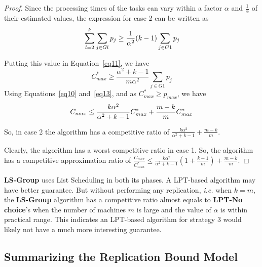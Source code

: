 \documentclass[twocolumn]{svjour3}
\begin{document}
\begin{proof}
  Since the processing times of the tasks can vary within a factor
  $\alpha$ and $\frac{1}{\alpha}$ of their estimated values, the
  expression for case 2 can be written as
  \begin{equation}{\nonumber}
    \sum_{l=2}^{k}\sum_{j \in Gl }^{}{ p_{j}} \geq \frac{1}{\alpha^2} (k-1)\sum_{j \in G1 }^{}{ p_{j}}
  \end{equation}
  
  Putting this value in Equation~\ref{eq11}, we have
  \begin{equation}\label{eq13}
    C_{max}^{*} \geq \frac{\alpha^2+k-1}{m\alpha^2}\sum_{j \in G1 }^{}{ p_{j}}
  \end{equation}
  Using Equations~\ref{eq10} and~\ref{eq13}, and as $C_{max}^{*} \geq p_{max}$, we have
  \begin{equation}{\nonumber}
    C_{max} \leq \frac{k\alpha^2}{\alpha^2+k-1}C_{max}^{*}+\frac{m-k}{m}C_{max}^{*}
  \end{equation}
  
  So, in case 2 the algorithm has a competitive ratio of
  $\frac{k\alpha^2}{\alpha^2+k-1}+\frac{m-k}{m}$.

  Clearly, the algorithm has a worst competitive ratio in case 1.  So,
  the algorithm has a competitive approximation ratio of
  $\frac{C_{max}}{C_{max}^{*}} \leq \frac{k\alpha^{2}}{\alpha^{2}+k-1}
  \left( 1+ {\frac{k-1}{m}} \right) + {\frac{m-k}{m}}$.
\end{proof}


\textbf{LS-Group} uses List Scheduling in both its phases. A LPT-based
algorithm may have better guarantee. But without performing any
replication, {\em i.e.} when $k=m$, the \textbf{LS-Group} algorithm
has a competitive ratio almost equals to \textbf{LPT-No choice}'s when
the number of machines $m$ is large and the value of $\alpha$ is
within practical range. This indicates an LPT-based algorithm for
strategy 3 would likely not have a much more interesting guarantee.

\subsection{Summarizing the Replication Bound Model}\label{sec7}
\label{sec:rbm-sum}
\end{document}
